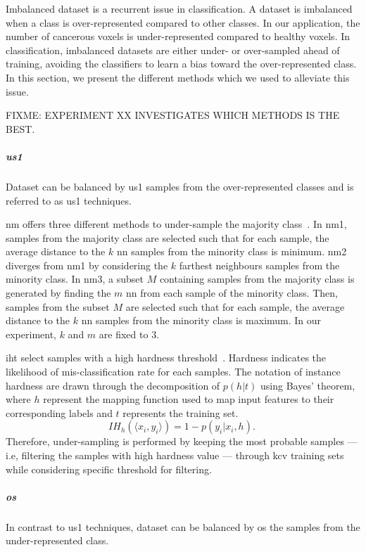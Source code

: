 \documentclass[a4paper,num-refs]{wiley-article}
\begin{document}
Imbalanced dataset is a recurrent issue in classification. A dataset is
imbalanced when a class is over-represented compared to other classes. In our
application, the number of cancerous voxels is under-represented compared to
healthy voxels. In classification, imbalanced datasets are either under- or
over-sampled ahead of training, avoiding the classifiers to learn a bias toward
the over-represented class. In this section, we present the different methods
which we used to alleviate this issue.

FIXME: EXPERIMENT XX INVESTIGATES WHICH METHODS IS THE BEST.

\subparagraph{\Acl*{us1}} Dataset can be balanced by \ac{us1} samples
from the over-represented classes and is referred to as \ac{us1} techniques.

\Ac{nm} offers three different methods to under-sample the majority
class~\cite{mani2003knn}. In \ac{nm1}, samples from the majority class are
selected such that for each sample, the average distance to the $k$ \ac{nn}
samples from the minority class is minimum. \ac{nm2} diverges from \ac{nm1} by
considering the $k$ farthest neighbours samples from the minority class. In
\ac{nm3}, a subset $M$ containing samples from the majority class is generated
by finding the $m$ \ac{nn} from each sample of the minority class. Then,
samples from the subset $M$ are selected such that for each sample, the average
distance to the $k$ \ac{nn} samples from the minority class is maximum. In our
experiment, $k$ and $m$ are fixed to 3.

\Ac{iht} select samples with a high hardness
threshold~\cite{smith2014instance}. Hardness indicates the likelihood of
mis-classification rate for each samples. The notation of instance hardness
are drawn through the decomposition of $p(h \vert t)$ using Bayes' theorem,
where $h$ represent the mapping function used to map input features to their
corresponding labels and $t$ represents the training set.
\begin{equation}
  IH_h(\langle x_{i}, y_{i}\rangle) = 1 - p(y_i \vert x_i, h).\
  \label{eq:iht}
\end{equation}
Therefore, under-sampling is performed by keeping the most probable samples ---
i.e, filtering the samples with high hardness value --- through \ac{kcv}
training sets while considering specific threshold for filtering.

\subparagraph{\Acl*{os}}
In contrast to \ac{us1} techniques, dataset can be balanced by \ac{os} the
samples from the under-represented class.
\end{document}
